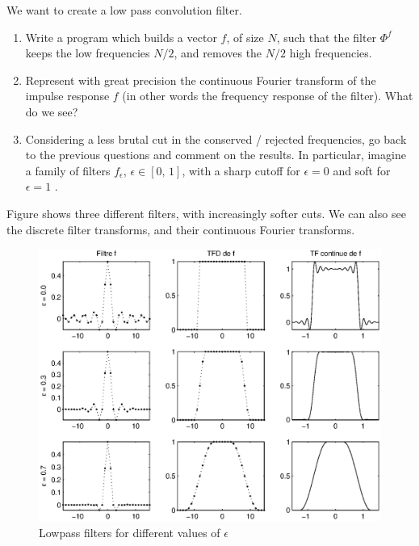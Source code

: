  
\begin{exo}
\label{exo-creation-low-pass-filter}
 
 We want to create a low pass convolution filter. \begin{enumerate}
\item Write a \Matlab{} program which builds a vector $ f $, of size $ N $, such that the filter $ \Phi^f $ keeps the low frequencies $ N / 2 $, and removes the $ N / 2 $ high frequencies.
\item {}  Represent with great precision the continuous Fourier transform of the impulse response $ f $ (in other words the frequency response of the filter). What do we see?
\item Considering a less brutal cut in the conserved / rejected frequencies, go back to the previous questions and comment on the results. In particular, imagine a family of filters $ f_{\epsilon} $, $ \epsilon \in [0, \, 1] $, with a sharp cutoff for $ \epsilon = 0 $ and soft for $ \epsilon = 1 $ .
\end{enumerate} Figure  shows three different filters, with increasingly softer cuts. We can also see the discrete filter transforms, and their continuous Fourier transforms. \begin{figure}[ht]
    \begin{center}
    \includegraphics[scale=0.7]{images/filtre-passe-bas.eps}
    \end{center}
    \caption{Lowpass filters for different values of $ \epsilon $}
              \label{fig-low-pass-filter}
\end{figure}
\end{exo}
 
